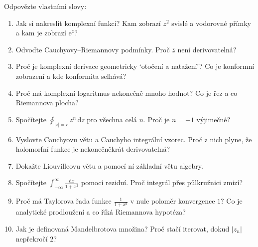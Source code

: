 \begin{problem}
  Odpovězte vlastními slovy:
  \begin{enumerate}
    \item Jak si nakreslit komplexní funkci? Kam zobrazí $z^2$ svislé a vodorovné přímky a kam je zobrazí $\mathrm{e}^z$?
    \item Odvoďte Cauchyovy--Riemannovy podmínky. Proč $\bar{z}$ není derivovatelná?
    \item Proč je komplexní derivace geometricky `otočení a natažení'? Co je konformní zobrazení a kde konformita selhává?
    \item Proč má komplexní logaritmus nekonečně mnoho hodnot? Co je řez a co Riemannova plocha?
    \item Spočítejte $\oint_{|z| = r}z^n\,\mathrm{d}z$ pro všechna celá $n$. Proč je $n = -1$ výjimečné?
    \item Vyslovte Cauchyovu větu a Cauchyho integrální vzorec. Proč z nich plyne, že holomorfní funkce je nekonečněkrát derivovatelná?
    \item Dokažte Liouvilleovu větu a pomocí ní základní větu algebry.
    \item Spočítejte $\int_{-\infty}^{\infty}\frac{\mathrm{d}x}{1 + x^2}$ pomocí reziduí. Proč integrál přes půlkružnici zmizí?
    \item Proč má Taylorova řada funkce $\frac{1}{1 + x^2}$ v nule poloměr konvergence $1$? Co je analytické prodloužení a co říká Riemannova hypotéza?
    \item Jak je definovaná Mandelbrotova množina? Proč stačí iterovat, dokud $|z_n|$ nepřekročí $2$?
  \end{enumerate}
\end{problem}
